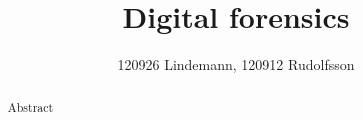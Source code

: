 

\title{Digital forensics}
\author{120926 Lindemann, 120912 Rudolfsson}



\maketitle

\begin{abstract}
 Abstract
\end{abstract}

\thispagestyle{empty}

\clearpage
{}
\setcounter{page}{1}
\tableofcontents

\clearpage
{}








\newpage




